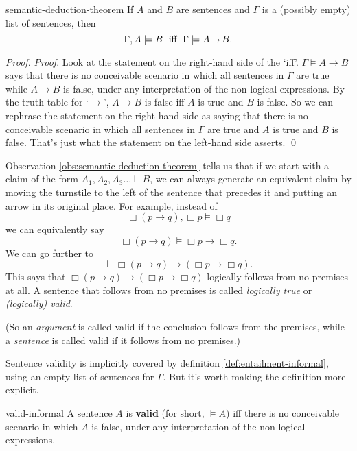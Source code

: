 \begin{observation}{semantic-deduction-theorem}
  If $A$ and $B$ are sentences and $\Gamma$ is a (possibly empty) list of sentences, then
  \vspace{-1mm}
  \[
    \Gamma,A \models B \text{ \;iff\; }\Gamma \models A \to B.
  \]
  \vspace{-5mm}
\end{observation}
%
\begin{proof}
  \emph{Proof}. Look at the statement on the right-hand side of the `iff'.
  $\Gamma \models A \to B$ says that there is no conceivable scenario in which
  all sentences in $\Gamma$ are true while $A\to B$ is false, under any
  interpretation of the non-logical expressions. By the truth-table for `$\to$',
  $A\to B$ is false iff $A$ is true and $B$ is false. So we can rephrase the
  statement on the right-hand side as saying that there is no conceivable
  scenario in which all sentences in $\Gamma$ are true and $A$ is true and $B$
  is false. That's just what the statement on the left-hand side asserts. \qed
\end{proof}

Observation \ref{obs:semantic-deduction-theorem} tells us that if we start with
a claim of the form $A_{1},A_{2},A_{3}\ldots \models B$, we can always generate
an equivalent claim by moving the turnstile to the left of the sentence that
precedes it and putting an arrow in its original place. For example, instead of
\begin{equation*}
  \Box (p \to q), \Box p \models \Box q
\end{equation*}
we can equivalently say
\begin{equation*}
  \Box (p \to q) \models \Box p \to \Box q.
\end{equation*}
We can go further to
\begin{equation*}
  \models \Box (p \to q) \to (\Box p \to \Box q).
\end{equation*}
This says that $\Box (p \to q) \to (\Box p \to \Box q)$ logically follows from
no premises at all. A sentence that follows from no premises is called
\emph{logically true} or \emph{(logically) valid}.

(So an \emph{argument} is called valid if the conclusion follows from the
premises, while a \emph{sentence} is called valid if it follows from no
premises.)

Sentence validity is implicitly covered by definition
\ref{def:entailment-informal}, using an empty list of sentences for $\Gamma$.
But it's worth making the definition more explicit.
%
\begin{definition}{}{valid-informal}
  A sentence $A$ is \textbf{valid} (for short, $\models A$) iff there is no
  conceivable scenario in which $A$ is false, under any interpretation of the
  non-logical expressions.
\end{definition}

